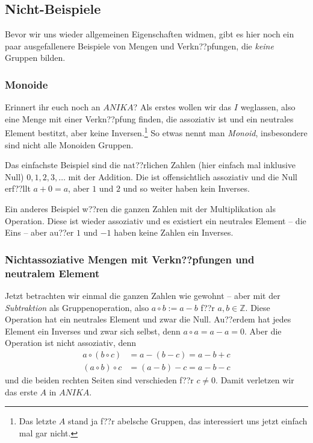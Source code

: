 \documentclass[a4paper,ngerman,12pt]{zirkelblatt1415}
\theoremstyle{definition}
\theoremstyle{plain}
\theoremstyle{remark}
\newcommand{\ZZ}{\mathbb{Z}}
\begin{document}
\subsection{Nicht-Beispiele}

Bevor wir uns wieder allgemeinen Eigenschaften widmen, gibt es hier noch ein paar ausgefallenere Beispiele von Mengen und Verkn??pfungen, die \emph{keine} Gruppen bilden.

\subsubsection{Monoide}

Erinnert ihr euch noch an $ANIKA$? Als erstes wollen wir das $I$ weglassen, also eine Menge mit einer Verkn??pfung finden, die assoziativ ist und ein neutrales Element bestitzt, aber keine Inversen.\footnote{Das letzte $A$ stand ja f??r abelsche Gruppen, das interessiert uns jetzt einfach mal gar nicht.} So etwas nennt man \emph{Monoid}, insbesondere sind nicht alle Monoiden Gruppen.

Das einfachste Beispiel sind die nat??rlichen Zahlen (hier einfach mal inklusive Null) $0,1,2,3,\ldots$ mit der Addition. Die ist offensichtlich assoziativ und die Null erf??llt $a+0=a$, aber $1$ und $2$ und so weiter haben kein Inverses.

Ein anderes Beispiel w??ren die ganzen Zahlen mit der Multiplikation als Operation. Diese ist wieder assoziativ und es existiert ein neutrales Element -- die Eins -- aber au??er $1$ und $-1$ haben keine Zahlen ein Inverses.

\subsubsection{Nichtassoziative Mengen mit Verkn??pfungen und neutralem Element}

Jetzt betrachten wir einmal die ganzen Zahlen wie gewohnt -- aber mit der \emph{Subtraktion} als Gruppenoperation, also $a\circ b:=a-b$ f??r $a,b\in\ZZ$. Diese Operation hat ein neutrales Element und zwar die Null. Au??erdem hat jedes Element ein Inverses und zwar sich selbst, denn $a\circ a=a-a=0$. Aber die Operation ist nicht assoziativ, denn
\begin{align*}
  a\circ(b\circ c)&=a-(b-c)=a-b+c \\
  (a\circ b)\circ c&=(a-b)-c=a-b-c
\end{align*}
und die beiden rechten Seiten sind verschieden f??r $c\neq 0$. Damit verletzen wir das erste $A$ in $ANIKA$.
\end{document}
